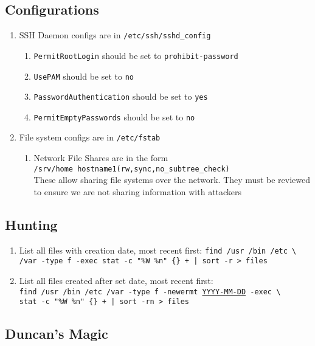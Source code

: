 \documentclass[12pt,letterpaper]{article}
\def\code#1{\textcolor{iris}{\texttt{#1}}}
\def\ul#1{\underline{#1}}
\begin{document}
\subsection{Configurations}

\begin{enumerate}
	\item SSH Daemon configs are in \code{/etc/ssh/sshd\_config}
		\begin{enumerate}
			\item \code{PermitRootLogin} should be set to \code{prohibit-password}
			\item \code{UsePAM} should be set to \code{no}
			\item \code{PasswordAuthentication} should be set to \code{yes}
			\item \code{PermitEmptyPasswords} should be set to \code{no}
		\end{enumerate}
	\item File system configs are in \code{/etc/fstab}
		\begin{enumerate}
			\item Network File Shares are in the form \\
				\code{/srv/home    hostname1(rw,sync,no\_subtree\_check)} \\
				These allow sharing file systems over the network.  They must be reviewed to ensure we are not sharing information with attackers
		\end{enumerate}
\end{enumerate}

\subsection{Hunting}

\begin{enumerate}
	\item List all files with creation date, most recent first: \code{find /usr /bin /etc \textbackslash \\
		/var -type f -exec stat -c "\%W \%n" \{\} + | sort -r > files}
	\item List all files created after set date, most recent first: \\
		\code{find /usr /bin /etc /var -type f -newermt \ul{YYYY-MM-DD} -exec \textbackslash \\
		stat -c "\%W \%n" \{\} + | sort -rn > files}
\end{enumerate}

\subsection{Duncan's Magic}
\label{subsec:dmagic}
\end{document}
